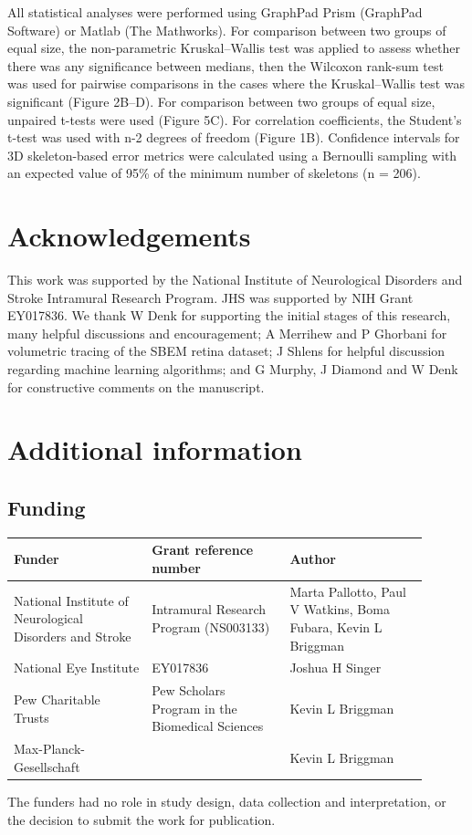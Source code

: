 \documentclass{article}
\begin{document}
All statistical analyses were performed using GraphPad Prism (GraphPad Software) or Matlab (The Mathworks). For comparison between two groups of equal size, the non-parametric Kruskal–Wallis test was applied to assess whether there was any significance between medians, then the Wilcoxon rank-sum test was used for pairwise comparisons in the cases where the Kruskal–Wallis test was significant (Figure 2B–D). For comparison between two groups of equal size, unpaired t-tests were used (Figure 5C). For correlation coefficients, the Student’s t-test was used with n-2 degrees of freedom (Figure 1B). Confidence intervals for 3D skeleton-based error metrics were calculated using a Bernoulli sampling with an expected value of 95\% of the minimum number of skeletons (n = 206).

\section*{Acknowledgements}

This work was supported by the National Institute of Neurological Disorders and Stroke Intramural Research Program. JHS was supported by NIH Grant EY017836. We thank W Denk for supporting the initial stages of this research, many helpful discussions and encouragement; A Merrihew and P Ghorbani for volumetric tracing of the SBEM retina dataset; J Shlens for helpful discussion regarding machine learning algorithms; and G Murphy, J Diamond and W Denk for constructive comments on the manuscript.

\section*{Additional information}

\subsection*{Funding}

\begin{center}\small
\begin{tabular}{p{0.3\linewidth}p{0.3\linewidth}p{0.3\linewidth}}
\toprule
\textbf{Funder} & \textbf{Grant reference number} & \textbf{Author}\\
\midrule
National Institute of Neurological Disorders and Stroke & Intramural Research Program (NS003133) & Marta Pallotto, Paul V Watkins, Boma Fubara, Kevin L Briggman\\
\midrule
National Eye Institute & EY017836 & Joshua H Singer\\
\midrule
Pew Charitable Trusts & Pew Scholars Program in the Biomedical Sciences & Kevin L Briggman\\
\midrule
Max-Planck-Gesellschaft & & Kevin L Briggman\\
\bottomrule
\end{tabular}
\end{center}
\noindent The funders had no role in study design, data collection and interpretation, or the decision to submit the work for publication.
\end{document}
